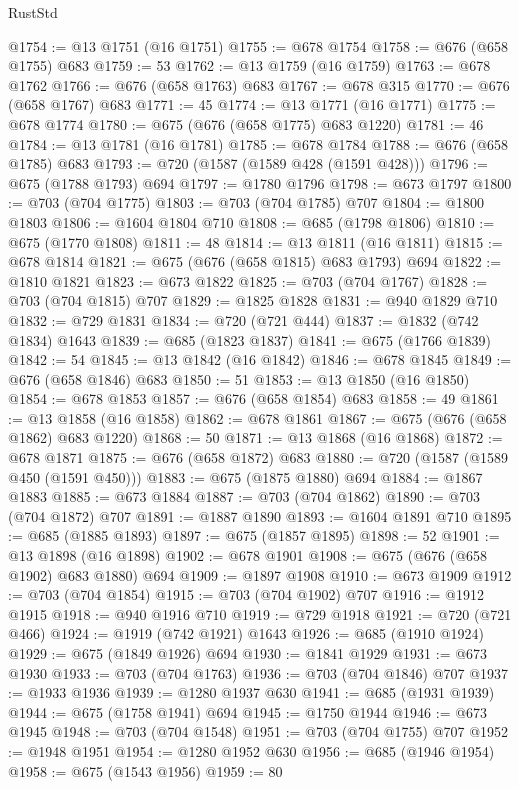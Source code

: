\begin{lexlean}{RustStd}
\begin{coremodule}
{\begin{coremodule}
{{{{{{{{{{{{@1754 := @13 @1751 (@16 @1751)
@1755 := @678 @1754
@1758 := @676 (@658 @1755) @683
@1759 := 53
@1762 := @13 @1759 (@16 @1759)
@1763 := @678 @1762
@1766 := @676 (@658 @1763) @683
@1767 := @678 @315
@1770 := @676 (@658 @1767) @683
@1771 := 45
@1774 := @13 @1771 (@16 @1771)
@1775 := @678 @1774
@1780 := @675 (@676 (@658 @1775) @683 @1220)
@1781 := 46
@1784 := @13 @1781 (@16 @1781)
@1785 := @678 @1784
@1788 := @676 (@658 @1785) @683
@1793 := @720 (@1587 (@1589 @428 (@1591 @428)))
@1796 := @675 (@1788 @1793) @694
@1797 := @1780 @1796
@1798 := @673 @1797
@1800 := @703 (@704 @1775)
@1803 := @703 (@704 @1785) @707
@1804 := @1800 @1803
@1806 := @1604 @1804 @710
@1808 := @685 (@1798 @1806)
@1810 := @675 (@1770 @1808)
@1811 := 48
@1814 := @13 @1811 (@16 @1811)
@1815 := @678 @1814
@1821 := @675 (@676 (@658 @1815) @683 @1793) @694
@1822 := @1810 @1821
@1823 := @673 @1822
@1825 := @703 (@704 @1767)
@1828 := @703 (@704 @1815) @707
@1829 := @1825 @1828
@1831 := @940 @1829 @710
@1832 := @729 @1831
@1834 := @720 (@721 @444)
@1837 := @1832 (@742 @1834) @1643
@1839 := @685 (@1823 @1837)
@1841 := @675 (@1766 @1839)
@1842 := 54
@1845 := @13 @1842 (@16 @1842)
@1846 := @678 @1845
@1849 := @676 (@658 @1846) @683
@1850 := 51
@1853 := @13 @1850 (@16 @1850)
@1854 := @678 @1853
@1857 := @676 (@658 @1854) @683
@1858 := 49
@1861 := @13 @1858 (@16 @1858)
@1862 := @678 @1861
@1867 := @675 (@676 (@658 @1862) @683 @1220)
@1868 := 50
@1871 := @13 @1868 (@16 @1868)
@1872 := @678 @1871
@1875 := @676 (@658 @1872) @683
@1880 := @720 (@1587 (@1589 @450 (@1591 @450)))
@1883 := @675 (@1875 @1880) @694
@1884 := @1867 @1883
@1885 := @673 @1884
@1887 := @703 (@704 @1862)
@1890 := @703 (@704 @1872) @707
@1891 := @1887 @1890
@1893 := @1604 @1891 @710
@1895 := @685 (@1885 @1893)
@1897 := @675 (@1857 @1895)
@1898 := 52
@1901 := @13 @1898 (@16 @1898)
@1902 := @678 @1901
@1908 := @675 (@676 (@658 @1902) @683 @1880) @694
@1909 := @1897 @1908
@1910 := @673 @1909
@1912 := @703 (@704 @1854)
@1915 := @703 (@704 @1902) @707
@1916 := @1912 @1915
@1918 := @940 @1916 @710
@1919 := @729 @1918
@1921 := @720 (@721 @466)
@1924 := @1919 (@742 @1921) @1643
@1926 := @685 (@1910 @1924)
@1929 := @675 (@1849 @1926) @694
@1930 := @1841 @1929
@1931 := @673 @1930
@1933 := @703 (@704 @1763)
@1936 := @703 (@704 @1846) @707
@1937 := @1933 @1936
@1939 := @1280 @1937 @630
@1941 := @685 (@1931 @1939)
@1944 := @675 (@1758 @1941) @694
@1945 := @1750 @1944
@1946 := @673 @1945
@1948 := @703 (@704 @1548)
@1951 := @703 (@704 @1755) @707
@1952 := @1948 @1951
@1954 := @1280 @1952 @630
@1956 := @685 (@1946 @1954)
@1958 := @675 (@1543 @1956)
@1959 := 80
}}}}}}}}}}}}
\end{coremodule}}
\end{coremodule}
\end{lexlean}
